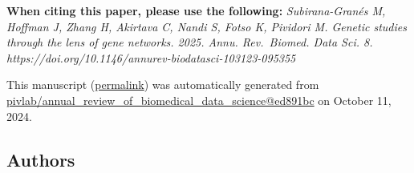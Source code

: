 { \textbf{When citing this paper, please use the following:}
\emph{Subirana-Granés M, Hoffman J, Zhang H, Akirtava C, Nandi S, Fotso K, Pividori M. Genetic studies through the lens of gene networks. 2025. Annu. Rev.~Biomed. Data Sci. 8. https://doi.org/10.1146/annurev-biodatasci-103123-095355}}

This manuscript
(\href{https://pivlab.github.io/annual_review_of_biomedical_data_science/v/ed891bc49e3bd7d3317c8b32dfe22cb07174dd37/}{permalink})
was automatically generated
from \href{https://github.com/pivlab/annual_review_of_biomedical_data_science/tree/ed891bc49e3bd7d3317c8b32dfe22cb07174dd37}{pivlab/annual\_review\_of\_biomedical\_data\_science@ed891bc}
on October 11, 2024.

\hypertarget{authors}{%
\subsection{Authors}\label{authors}}

